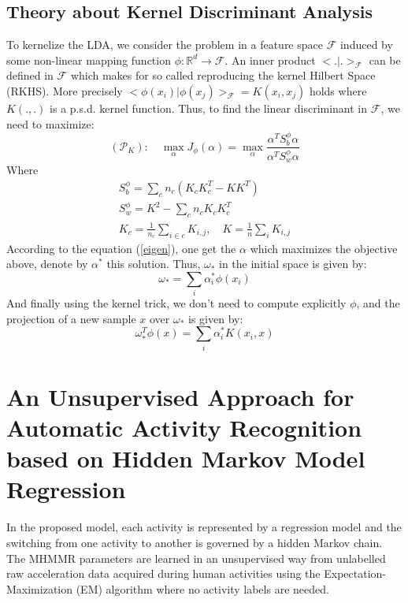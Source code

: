 \documentclass[11pt,a4paper,oneside]{article}
\begin{document}
\subsection{Theory about Kernel Discriminant Analysis}
To kernelize the LDA, we consider the problem in a feature space $\mathcal{F}$ induced by some non-linear mapping function $\phi : \mathbb{R}^d \rightarrow \mathcal{F}$. An inner product $<.|.>_{\mathcal{F}}$ can be defined in $\mathcal{F}$ which makes for so called reproducing the kernel Hilbert Space (RKHS). More precisely $<\phi(x_i)|\phi(x_j)>_{\mathcal{F}}=K(x_i,x_j)$ holds where $K(.,.)$ is a p.s.d. kernel function. Thus, to find the linear discriminant in $\mathcal{F}$, we need to maximize:
\begin{equation}
(\mathcal{P}_K):\quad \max_{\alpha} J_{\phi}(\alpha) = \max_{\alpha} \frac{\alpha^T S_b^{\phi} \alpha}{\alpha^T S_w^{\phi} \alpha}
\end{equation}
Where 
\begin{equation}
\begin{split}
S_b^{\phi} = \sum_c n_c (K_c K_c^T - K K^T)\\
S_w^{\phi} = K^2 - \sum_c n_c K_c K_c^T \\
K_c = \frac{1}{n_c} \sum_{i\in c} K_{i,j}, \quad K = \frac{1}{n} \sum_{i} K_{i,j}
\end{split}
\end{equation}
According to the equation (\ref{eigen}), one get the $\alpha$ which maximizes the objective above, denote by $\alpha^*$ this solution. Thus, $\omega_*$ in the initial space is given by:
\begin{equation}
\omega_* = \sum_i \alpha_i^* \phi(x_i)
\end{equation}
And finally using the kernel trick, we don't need to compute explicitly $\phi$, and the projection of a new sample $x$ over $\omega_*$ is given by:
\begin{equation}
\omega_*^T\phi(x) = \sum_i \alpha_i^* K(x_i,x)
\end{equation}



\section{An Unsupervised Approach for Automatic Activity Recognition based on Hidden Markov Model Regression \cite{attal}}
\label{hmm}

In the proposed model, each activity is represented by a regression model and the switching from one activity to another is governed by a hidden Markov chain.
The MHMMR parameters are learned in an unsupervised way from unlabelled raw acceleration data acquired during human activities using the Expectation-Maximization (EM) algorithm where no activity labels are needed. 
\end{document}
